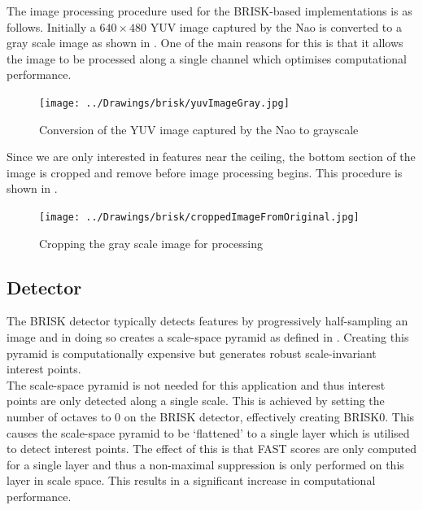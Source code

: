 \documentclass{report}
\begin{document}
The image processing procedure used for the BRISK-based implementations is as follows. Initially a $640 \times 480$ YUV image captured by the Nao is converted to a gray scale image as shown in . One of the main reasons for this is that it allows the image to be processed along a single channel which optimises computational performance. \\

\begin{figure}[h!] 
  \centering
    \texttt{[image: ../Drawings/brisk/yuvImageGray.jpg]}
    \caption{Conversion of the YUV image captured by the Nao to grayscale}
    \label{fig:colourGrayscale}
\end{figure}

Since we are only interested in features near the ceiling, the bottom section of the image is cropped and remove before image processing begins. This procedure is shown in .\\

\begin{figure}[h!] 
  \centering
    \texttt{[image: ../Drawings/brisk/croppedImageFromOriginal.jpg]}
    \caption{Cropping the gray scale image for processing}
    \label{fig:cropImage}
\end{figure}

\subsection{Detector}
\label{sec:BRISK0Detect}
The BRISK detector typically detects features by progressively half-sampling an image and in doing so creates a scale-space pyramid as defined in . Creating this pyramid is computationally expensive but generates robust scale-invariant interest points.\\

The scale-space pyramid is not needed for this application and thus interest points are only detected along a single scale. This is achieved by setting the number of octaves to $0$ on the BRISK detector, effectively creating BRISK0. This causes the scale-space pyramid to be `flattened' to a single layer which is utilised to detect interest points. The effect of this is that FAST scores are only computed for a single layer and thus a non-maximal suppression is only performed on this layer in scale space. This results in a significant increase in computational performance. \\
\end{document}
